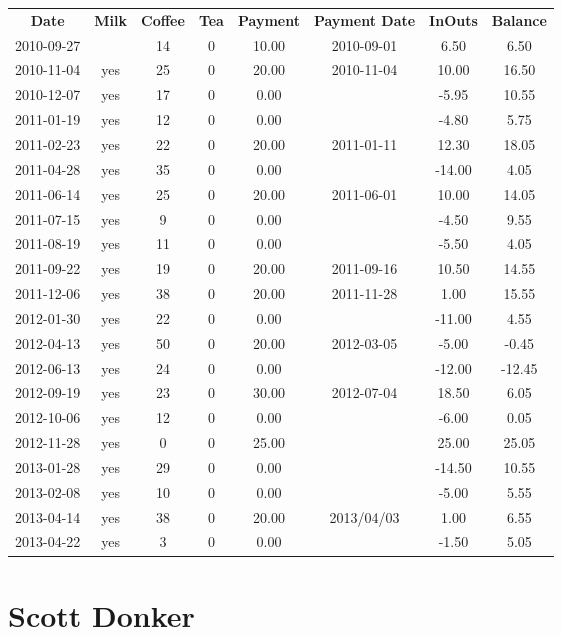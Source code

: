 \begin{center}
\begin{tabular}{cccccccc}
\textbf{Date} & \textbf{Milk} & \textbf{Coffee} & \textbf{Tea} & \textbf{Payment} & \textbf{Payment Date} & \textbf{InOuts} & \textbf{Balance} \\
2010-09-27 &  & 14 & 0 & 10.00 & 2010-09-01 &   6.50 &   6.50\\ 
2010-11-04 & yes & 25 & 0 & 20.00 & 2010-11-04 &  10.00 &  16.50\\ 
2010-12-07 & yes & 17 & 0 &  0.00 &  &  -5.95 &  10.55\\ 
2011-01-19 & yes & 12 & 0 &  0.00 &  &  -4.80 &   5.75\\ 
2011-02-23 & yes & 22 & 0 & 20.00 & 2011-01-11 &  12.30 &  18.05\\ 
2011-04-28 & yes & 35 & 0 &  0.00 &  & -14.00 &   4.05\\ 
2011-06-14 & yes & 25 & 0 & 20.00 & 2011-06-01 &  10.00 &  14.05\\ 
2011-07-15 & yes &  9 & 0 &  0.00 &  &  -4.50 &   9.55\\ 
2011-08-19 & yes & 11 & 0 &  0.00 &  &  -5.50 &   4.05\\ 
2011-09-22 & yes & 19 & 0 & 20.00 & 2011-09-16 &  10.50 &  14.55\\ 
2011-12-06 & yes & 38 & 0 & 20.00 & 2011-11-28 &   1.00 &  15.55\\ 
2012-01-30 & yes & 22 & 0 &  0.00 &  & -11.00 &   4.55\\ 
2012-04-13 & yes & 50 & 0 & 20.00 & 2012-03-05 &  -5.00 &  -0.45\\ 
2012-06-13 & yes & 24 & 0 &  0.00 &  & -12.00 & -12.45\\ 
2012-09-19 & yes & 23 & 0 & 30.00 & 2012-07-04 &  18.50 &   6.05\\ 
2012-10-06 & yes & 12 & 0 &  0.00 &  &  -6.00 &   0.05\\ 
2012-11-28 & yes &  0 & 0 & 25.00 &  &  25.00 &  25.05\\ 
2013-01-28 & yes & 29 & 0 &  0.00 &  & -14.50 &  10.55\\ 
2013-02-08 & yes & 10 & 0 &  0.00 &  &  -5.00 &   5.55\\ 
2013-04-14 & yes & 38 & 0 & 20.00 & 2013/04/03 &   1.00 &   6.55\\ 
2013-04-22 & yes &  3 & 0 &  0.00 &  &  -1.50 &   5.05
\end{tabular}
\end{center}

\section{Scott Donker}

